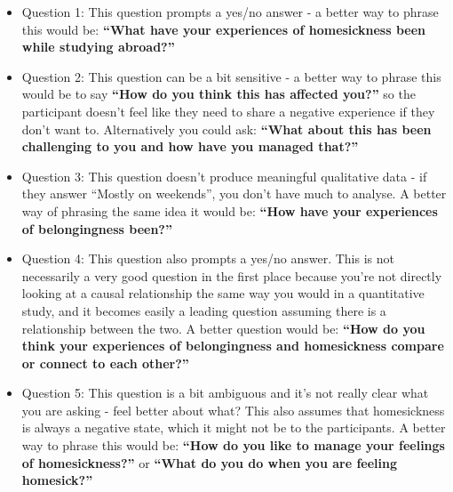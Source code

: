 \documentclass[
  english,
  letterpaper,
  DIV=11,
  numbers=noendperiod]{scrreprt}
\providecommand{\tightlist}{%
  \setlength{\itemsep}{0pt}\setlength{\parskip}{0pt}}
\begin{document}
\begin{tcolorbox}[enhanced jigsaw, breakable, bottomtitle=1mm, leftrule=.75mm, opacityback=0, colbacktitle=quarto-callout-caution-color!10!white, opacitybacktitle=0.6, toprule=.15mm, colback=white, left=2mm, coltitle=black, bottomrule=.15mm, titlerule=0mm, title={Suggested Answers}, toptitle=1mm, colframe=quarto-callout-caution-color-frame, arc=.35mm, rightrule=.15mm]

\begin{itemize}
\tightlist
\item
  Question 1: This question prompts a yes/no answer - a better way to
  phrase this would be: \textbf{``What have your experiences of
  homesickness been while studying abroad?''}
\item
  Question 2: This question can be a bit sensitive - a better way to
  phrase this would be to say \textbf{``How do you think this has
  affected you?''} so the participant doesn't feel like they need to
  share a negative experience if they don't want to. Alternatively you
  could ask: \textbf{``What about this has been challenging to you and
  how have you managed that?''}
\item
  Question 3: This question doesn't produce meaningful qualitative data
  - if they answer ``Mostly on weekends'', you don't have much to
  analyse. A better way of phrasing the same idea it would be:
  \textbf{``How have your experiences of belongingness been?''}
\item
  Question 4: This question also prompts a yes/no answer. This is not
  necessarily a very good question in the first place because you're not
  directly looking at a causal relationship the same way you would in a
  quantitative study, and it becomes easily a leading question assuming
  there is a relationship between the two. A better question would be:
  \textbf{``How do you think your experiences of belongingness and
  homesickness compare or connect to each other?''}
\item
  Question 5: This question is a bit ambiguous and it's not really clear
  what you are asking - feel better about what? This also assumes that
  homesickness is always a negative state, which it might not be to the
  participants. A better way to phrase this would be: \textbf{``How do
  you like to manage your feelings of homesickness?''} or \textbf{``What
  do you do when you are feeling homesick?''}
\end{itemize}

\end{tcolorbox}
\end{document}
